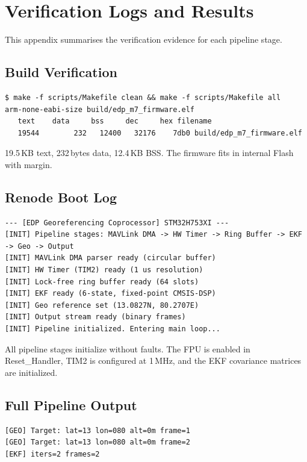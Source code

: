 \chapter{Verification Logs and Results}
\label{app:E}

This appendix summarises the verification evidence for each pipeline stage.

\section{Build Verification}

\begin{lstlisting}[style=plainstyle]
$ make -f scripts/Makefile clean && make -f scripts/Makefile all
arm-none-eabi-size build/edp_m7_firmware.elf
   text	   data	    bss	    dec	    hex	filename
   19544	    232	  12400	  32176	   7db0	build/edp_m7_firmware.elf
\end{lstlisting}

19.5\,KB text, 232\,bytes data, 12.4\,KB BSS. The firmware fits in internal Flash with margin.

\section{Renode Boot Log}

\begin{lstlisting}[style=plainstyle]
--- [EDP Georeferencing Coprocessor] STM32H753XI ---
[INIT] Pipeline stages: MAVLink DMA -> HW Timer -> Ring Buffer -> EKF -> Geo -> Output
[INIT] MAVLink DMA parser ready (circular buffer)
[INIT] HW Timer (TIM2) ready (1 us resolution)
[INIT] Lock-free ring buffer ready (64 slots)
[INIT] EKF ready (6-state, fixed-point CMSIS-DSP)
[INIT] Geo reference set (13.0827N, 80.2707E)
[INIT] Output stream ready (binary frames)
[INIT] Pipeline initialized. Entering main loop...
\end{lstlisting}

All pipeline stages initialize without faults. The FPU is enabled in Reset\_Handler, TIM2 is configured at 1\,MHz, and the EKF covariance matrices are initialized.

\section{Full Pipeline Output}

\begin{lstlisting}[style=plainstyle]
[GEO] Target: lat=13 lon=080 alt=0m frame=1
[GEO] Target: lat=13 lon=080 alt=0m frame=2
[EKF] iters=2 frames=2
\end{lstlisting}

